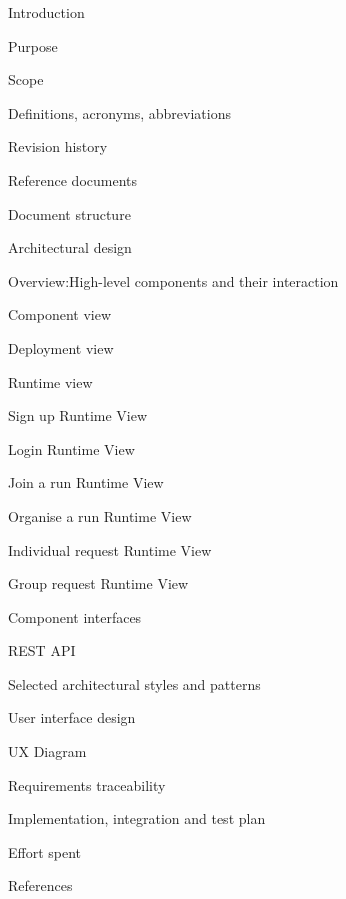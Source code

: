 \documentclass{article}
\begin{document}
	\begin{legal}
 	\item Introduction
  		\begin{legal}
    		\item Purpose
		\item Scope
		\item Definitions, acronyms, abbreviations
		\item Revision history
		\item Reference documents
		\item Document structure	
  		\end{legal}
	\item Architectural design
  		\begin{legal}
    		\item Overview:High-level components and their interaction
		\item Component view
		\item Deployment view
		\item Runtime view
			\begin{legal}
			\item Sign up Runtime View
			\item Login Runtime View
			\item Join a run Runtime View
			\item Organise a run Runtime View
			\item Individual request Runtime View
			\item Group request Runtime View
	  		\end{legal}
		\item Component interfaces
			\begin{legal}
			\item REST API
	  		\end{legal}
		\item Selected architectural styles and patterns
  		\end{legal}
	\item User interface design
  		\begin{legal}
    		\item UX Diagram
  		\end{legal}
	\item Requirements traceability
	\item Implementation, integration and test plan
  	\item Effort spent
	\item References
	\end{legal}
	
	\newpage
	\begin{legal}
	\item {}
	\newpage
	\item{}
	\newpage
	\item{}
	\newpage
	\item{}
	\newpage
	\item{}
	\newpage
	\item{}
	\newpage
	\item{}
	\end{legal}
\end{document}
